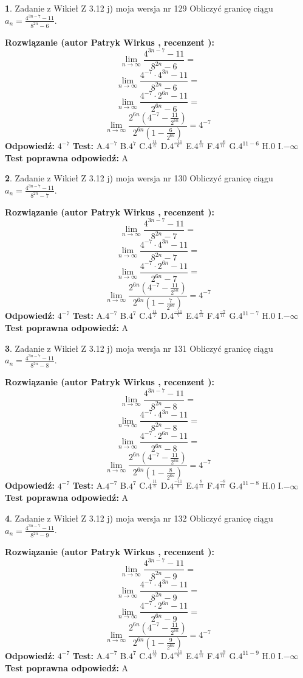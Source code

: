 \documentclass[12pt, a4paper]{article}
\theoremstyle{definition} %
\newtheorem{zad}{}
\newcommand{\zadStart}[1]{\begin{zad}#1\newline}
\newcommand{\zadStop}{\end{zad}}
\newcommand{\rozwStart}[2]{\noindent \textbf{Rozwiązanie (autor #1 , recenzent #2): }\newline}
\newcommand{\rozwStop}{\newline}
\newcommand{\odpStart}{\noindent \textbf{Odpowiedź:}\newline}
\newcommand{\odpStop}{\newline}
\newcommand{\testStart}{\noindent \textbf{Test:}\newline}
\newcommand{\testStop}{\newline}
\newcommand{\kluczStart}{\noindent \textbf{Test poprawna odpowiedź:}\newline}
\newcommand{\kluczStop}{\newline}
\begin{document}
\zadStart{Zadanie z Wikieł Z 3.12 j) moja wersja nr 129}
Obliczyć granicę ciągu $a_{n}=\frac{4^{3n-7}-11}{8^{2n}-6}$.
\zadStop
\rozwStart{Patryk Wirkus}{}
$$\lim\limits_{n\to\infty}\frac{4^{3n-7}-11}{8^{2n}-6}=$$
$$\lim\limits_{n\to\infty}\frac{4^{-7} \cdot 4^{3n}-11}{8^{2n}-6}=$$
$$\lim\limits_{n\to\infty}\frac{4^{-7} \cdot 2^{6n}-11}{2^{6n}-6}=$$
$$\lim\limits_{n\to\infty}\frac{2^{6n}(4^{-7} - \frac{11}{2^{6n}})}{2^{6n}(1-\frac{6}{2^{6n}})}= 4^{-7}$$
\rozwStop
\odpStart
$4^{-7}$
\odpStop
\testStart
A.$4^{-7}$
B.$4^{7}$
C.$4^{\frac{11}{6}}$
D.$4^{\frac{-11}{6}}$
E.$4^{\frac{6}{11}}$
F.$4^{\frac{-6}{11}}$
G.$4^{11-6}$
H.$0$
I.$-\infty$
\testStop
\kluczStart
A
\kluczStop



\zadStart{Zadanie z Wikieł Z 3.12 j) moja wersja nr 130}
Obliczyć granicę ciągu $a_{n}=\frac{4^{3n-7}-11}{8^{2n}-7}$.
\zadStop
\rozwStart{Patryk Wirkus}{}
$$\lim\limits_{n\to\infty}\frac{4^{3n-7}-11}{8^{2n}-7}=$$
$$\lim\limits_{n\to\infty}\frac{4^{-7} \cdot 4^{3n}-11}{8^{2n}-7}=$$
$$\lim\limits_{n\to\infty}\frac{4^{-7} \cdot 2^{6n}-11}{2^{6n}-7}=$$
$$\lim\limits_{n\to\infty}\frac{2^{6n}(4^{-7} - \frac{11}{2^{6n}})}{2^{6n}(1-\frac{7}{2^{6n}})}= 4^{-7}$$
\rozwStop
\odpStart
$4^{-7}$
\odpStop
\testStart
A.$4^{-7}$
B.$4^{7}$
C.$4^{\frac{11}{7}}$
D.$4^{\frac{-11}{7}}$
E.$4^{\frac{7}{11}}$
F.$4^{\frac{-7}{11}}$
G.$4^{11-7}$
H.$0$
I.$-\infty$
\testStop
\kluczStart
A
\kluczStop



\zadStart{Zadanie z Wikieł Z 3.12 j) moja wersja nr 131}
Obliczyć granicę ciągu $a_{n}=\frac{4^{3n-7}-11}{8^{2n}-8}$.
\zadStop
\rozwStart{Patryk Wirkus}{}
$$\lim\limits_{n\to\infty}\frac{4^{3n-7}-11}{8^{2n}-8}=$$
$$\lim\limits_{n\to\infty}\frac{4^{-7} \cdot 4^{3n}-11}{8^{2n}-8}=$$
$$\lim\limits_{n\to\infty}\frac{4^{-7} \cdot 2^{6n}-11}{2^{6n}-8}=$$
$$\lim\limits_{n\to\infty}\frac{2^{6n}(4^{-7} - \frac{11}{2^{6n}})}{2^{6n}(1-\frac{8}{2^{6n}})}= 4^{-7}$$
\rozwStop
\odpStart
$4^{-7}$
\odpStop
\testStart
A.$4^{-7}$
B.$4^{7}$
C.$4^{\frac{11}{8}}$
D.$4^{\frac{-11}{8}}$
E.$4^{\frac{8}{11}}$
F.$4^{\frac{-8}{11}}$
G.$4^{11-8}$
H.$0$
I.$-\infty$
\testStop
\kluczStart
A
\kluczStop



\zadStart{Zadanie z Wikieł Z 3.12 j) moja wersja nr 132}
Obliczyć granicę ciągu $a_{n}=\frac{4^{3n-7}-11}{8^{2n}-9}$.
\zadStop
\rozwStart{Patryk Wirkus}{}
$$\lim\limits_{n\to\infty}\frac{4^{3n-7}-11}{8^{2n}-9}=$$
$$\lim\limits_{n\to\infty}\frac{4^{-7} \cdot 4^{3n}-11}{8^{2n}-9}=$$
$$\lim\limits_{n\to\infty}\frac{4^{-7} \cdot 2^{6n}-11}{2^{6n}-9}=$$
$$\lim\limits_{n\to\infty}\frac{2^{6n}(4^{-7} - \frac{11}{2^{6n}})}{2^{6n}(1-\frac{9}{2^{6n}})}= 4^{-7}$$
\rozwStop
\odpStart
$4^{-7}$
\odpStop
\testStart
A.$4^{-7}$
B.$4^{7}$
C.$4^{\frac{11}{9}}$
D.$4^{\frac{-11}{9}}$
E.$4^{\frac{9}{11}}$
F.$4^{\frac{-9}{11}}$
G.$4^{11-9}$
H.$0$
I.$-\infty$
\testStop
\kluczStart
A
\kluczStop
\end{document}
